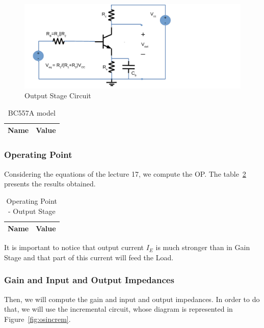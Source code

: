 \begin{figure}[H] \centering
\includegraphics[width=0.8\linewidth]{outstage.pdf}
\caption{Output Stage Circuit}                                     %
\label{fig:oscircuit}
\end{figure}

\begin{table}[H]
  \centering
  \begin{tabular}{|l|r|}
     \hline    
    {\bf Name} & {\bf Value} \\ \hline   
    
  \end{tabular}
  \caption{BC557A model}
  \label{tab:modelos}
\end{table}

\subsubsection{Operating Point}
Considering the equations of the lecture 17, we compute the OP. The table~\ref{tab:osop} presents the results obtained.

\begin{table}[H]
  \centering
  \begin{tabular}{|l|r|}
     \hline    
    {\bf Name} & {\bf Value} \\ \hline   
    
  \end{tabular}
  \caption{Operating Point - Output Stage}
  \label{tab:osop}
\end{table}

It is important to notice that output current $I_E$ is much stronger than in Gain Stage and that part of this current will feed the Load.

\subsubsection{Gain and Input and Output Impedances}
Then, we will compute the gain and input and output impedances. In order to do that, we will  use the incremental circuit, whose diagram is represented in Figure~\ref{fig:osincrem}.

